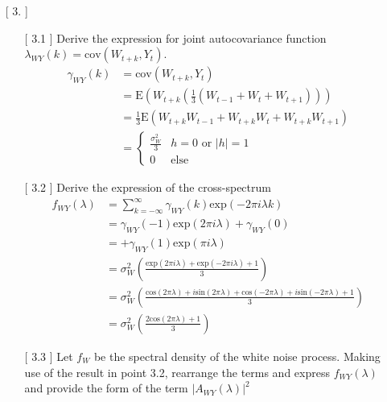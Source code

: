 \documentclass[10pt,a4paper]{article}
\begin{document}
\begin{enumerate}
	\item[[ 3.]] 
	\begin{enumerate}
		\item[[ 3.1]] Derive the expression for joint autocovariance function $\lambda_{WY}(k) = \text{cov}(W_{t+k},Y_t)$.
		\begin{align*}
			\gamma_{WY}(k) &= \text{cov}(W_{t+k},Y_t) \\
			&= \text{E}(W_{t+k}(\frac{1}{3}(W_{t-1}+W_{t}+W_{t+1}))) \\
			&= \frac{1}{3} \text{E}(W_{t+k}W_{t-1}+W_{t+k}W_{t}+W_{t+k}W_{t+1}) \\
			&=  	\left\{
			\begin{array}{ll}
				\frac{\sigma_{W}^2}{3} & h=0 \text{  or  } |h| = 1\\
				0 & \text{else}
			\end{array}
			\right.
		\end{align*}
		\item[[ 3.2]] Derive the expression of the cross-spectrum
		\begin{align*}
			f_{WY}(\lambda) &= \sum_{k=-\infty}^{\infty} \gamma_{WY}(k) \text{exp}(-2\pi i \lambda k) \\
			&= \gamma_{WY}(-1) \text{exp}(2\pi i \lambda) + \gamma_{WY}(0) \\ &= + \gamma_{WY}(1) \text{exp}(\pi i \lambda) \\
			&= \sigma_{W}^2 \left( \frac{\text{exp}(2\pi i \lambda) + \text{exp}(-2\pi i \lambda) + 1}{3}\right) \\
			&= \sigma_{W}^2 \left( \frac{\text{cos}(2\pi \lambda) + i\text{sin}(2\pi \lambda) +\text{cos}(-2\pi \lambda) + i\text{sin}(-2\pi \lambda) + 1}{3}\right) \\
			&= \sigma_{W}^2 \left( \frac{2\text{cos}(2\pi \lambda) + 1}{3}\right)
		\end{align*}
		\item[[ 3.3]] Let $f_W$ be the spectral density of the white noise process. Making use of the result in point 3.2, rearrange the terms and express $f_{WY}(\lambda)$ and provide the form of the term $|A_{WY}(\lambda)|^2$
		

\end{enumerate}
\end{enumerate}
\end{document}
